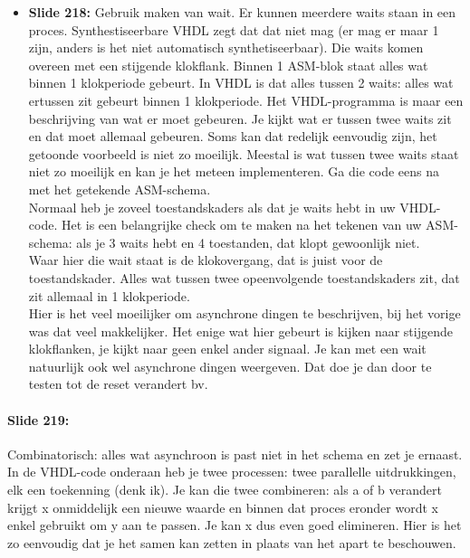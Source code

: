 \documentclass[10pt,a4paper]{book}
\begin{document}
\begin{itemize}
\item \textbf{Slide 218:} Gebruik maken van wait. Er kunnen meerdere waits staan in een proces. Synthestiseerbare VHDL zegt dat dat niet mag (er mag er maar 1 zijn, anders is het niet automatisch synthetiseerbaar). Die waits komen overeen met een stijgende klokflank. Binnen 1 ASM-blok staat alles wat binnen 1 klokperiode gebeurt. In VHDL is dat alles tussen 2 waits: alles wat ertussen zit gebeurt binnen 1 klokperiode. Het VHDL-programma is maar een beschrijving van wat er moet gebeuren. Je kijkt wat er tussen twee waits zit en dat moet allemaal gebeuren. Soms kan dat redelijk eenvoudig zijn, het getoonde voorbeeld is niet zo moeilijk. Meestal is wat tussen twee waits staat niet zo moeilijk en kan je het meteen implementeren. Ga die code eens na met het getekende ASM-schema.\\
Normaal heb je zoveel toestandskaders als dat je waits hebt in uw VHDL-code. Het is een belangrijke check om te maken na het tekenen van uw ASM-schema: als je 3 waits hebt en 4 toestanden, dat klopt gewoonlijk niet.\\ %
Waar hier die wait staat is de klokovergang, dat is juist voor de toestandskader. Alles wat tussen twee opeenvolgende toestandskaders zit, dat zit allemaal in 1 klokperiode.\\
Hier is het veel moeilijker om asynchrone dingen te beschrijven, bij het vorige was dat veel makkelijker. Het enige wat hier gebeurt is kijken naar stijgende klokflanken, je kijkt naar geen enkel ander signaal. Je kan met een wait natuurlijk ook wel asynchrone dingen weergeven. Dat doe je dan door te testen tot de reset verandert bv. 
\end{itemize}

\paragraph{Slide 219:} Combinatorisch: alles wat asynchroon is past niet in het schema en zet je ernaast. In de VHDL-code onderaan heb je twee processen: twee parallelle uitdrukkingen, elk een toekenning (denk ik). Je kan die twee combineren: als a of b verandert krijgt x onmiddelijk een nieuwe waarde en binnen dat proces eronder wordt x enkel gebruikt om y aan te passen. Je kan x dus even goed elimineren. Hier is het zo eenvoudig dat je het samen kan zetten in plaats van het apart te beschouwen.
\end{document}
